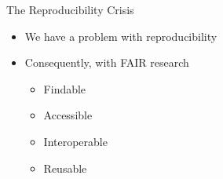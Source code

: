 \begin{frame}{The Reproducibility Crisis}
   \begin{itemize}
      \itemsep8pt
      \item<2-> We have a problem with reproducibility\supercite{baker20161,ioannidis2005most}
      \item<3-> Consequently, with FAIR research\supercite{barker2022introducing} \begin{itemize}
         \item Findable %
         \item Accessible %
         \item Interoperable %
         \item Reusable %
      \end{itemize}
   \end{itemize}
\end{frame}
